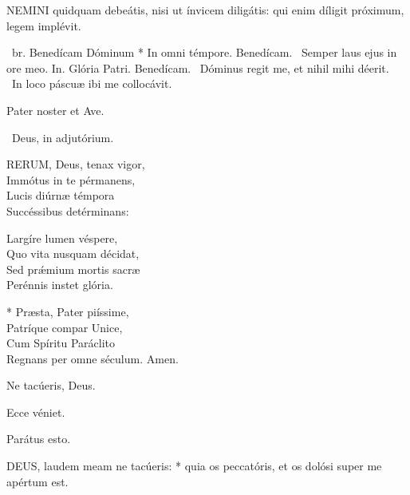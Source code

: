 



\lettrine[lines=2]{N}{EMINI} quidquam debeátis, nisi ut ínvicem diligátis: qui enim díligit próximum, legem implévit.

\R\ br. Benedícam Dóminum * In omni témpore. Benedícam. \V\ Semper laus ejus in ore meo. In. Glória Patri. Benedícam. \V\ Dóminus regit me, et nihil mihi déerit. \R\ In loco páscuæ ibi me collocávit.



\sectionornament


Pater noster et Ave.

\V\ Deus, in adjutórium.


\lettrine[lines=2]{R}{ERUM}, Deus, tenax vigor,\\
Immótus in te pérmanens,\\
Lucis diúrnæ témpora\\
Succéssibus detérminans:

Largíre lumen véspere,\\
Quo vita nusquam décidat,\\
Sed prǽmium mortis sacræ\\
Perénnis instet glória.

* Præsta, Pater piíssime,\\
Patríque compar Unice,\\
Cum Spíritu Paráclito\\
Regnans per omne séculum. Amen.

  Ne tacúeris, Deus.


  Ecce véniet.

  Parátus esto.


\lettrine[lines=2]{D}{EUS}, laudem meam ne tacúeris: * quia os peccatóris, et os dolósi super me apértum est.

